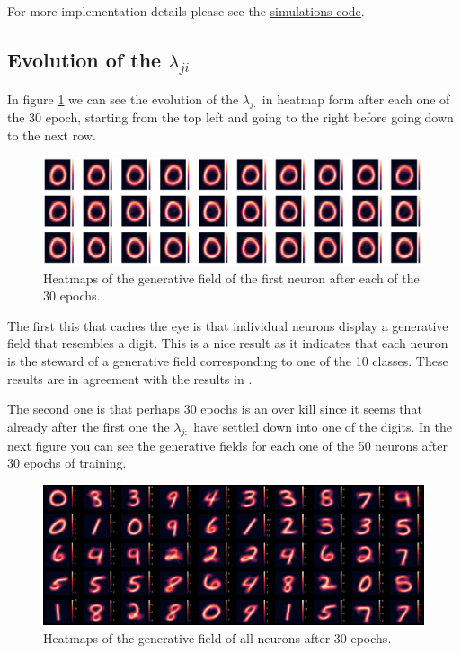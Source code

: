 \documentclass{article}
\begin{document}
For more implementation details please see the \href{https://github.com/Sann5/neural_populations}{\color{draculacyan} simulations code}.

\subsection{Evolution of the $\lambda_{ji}$}
In figure \ref{gen_filed_evo} we can see the evolution of the \(\lambda_{j:}\) in heatmap form after each one of the 30 epoch, starting from the top left and going to the right before going down to the next row. 

\begin{figure}[h]
    \includegraphics[width=\textwidth]{img/output_41_1.png}
    \caption{Heatmaps of the generative field of the first neuron after each of the 30 epochs. \label{gen_filed_evo}}
\end{figure}

The first this that caches the eye is that individual neurons display a generative field that resembles a digit. This is a nice result as it indicates that each neuron is the steward of a generative field corresponding to one of the 10 classes. These results are in agreement with the results in \cite{Keck2012}.

The second one is that perhaps 30 epochs is an over kill since it seems that already after the first one the \(\lambda_{j:}\) have settled down into one of the digits. In the next figure you can see the generative fields for each one of the 50 neurons after 30 epochs of training.

\begin{figure}[h]
    \includegraphics[width=\textwidth]{img/output_43_1.png}
    \caption{Heatmaps of the generative field of all neurons after 30 epochs. \label{gen_fileds}}
\end{figure}
\end{document}

